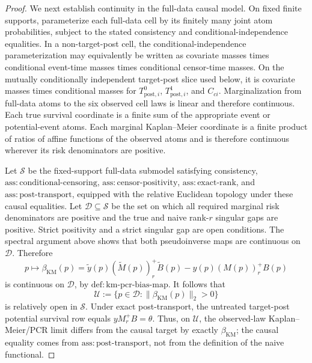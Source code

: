 \documentclass{article}
\begin{document}
\begin{proof}
We next establish continuity in the full-data causal model. On fixed finite supports, parameterize each full-data cell by its finitely many joint atom probabilities, subject to the stated consistency and conditional-independence equalities. In a non-target-post cell, the conditional-independence parameterization may equivalently be written as covariate masses times conditional event-time masses times conditional censor-time masses. On the mutually conditionally independent target-post slice used below, it is covariate masses times conditional masses for \(T^{0}_{\mathrm{post},i}\), \(T^{1}_{\mathrm{post},i}\), and \(C_{ci}\). Marginalization from full-data atoms to the six observed cell laws is linear and therefore continuous. Each true survival coordinate is a finite sum of the appropriate event or potential-event atoms. Each marginal Kaplan--Meier coordinate is a finite product of ratios of affine functions of the observed atoms and is therefore continuous wherever its risk denominators are positive.

Let \(\mathcal S\) be the fixed-support full-data submodel satisfying consistency, \(\mathrm{ass{:}conditional\mbox{-}censoring}\), \(\mathrm{ass{:}censor\mbox{-}positivity}\), \(\mathrm{ass{:}exact\mbox{-}rank}\), and \(\mathrm{ass{:}post\mbox{-}transport}\), equipped with the relative Euclidean topology under these causal equalities. Let \(\mathcal D\subseteq\mathcal S\) be the set on which all required marginal risk denominators are positive and the true and naive rank-\(r\) singular gaps are positive. Strict positivity and a strict singular gap are open conditions. The spectral argument above shows that both pseudoinverse maps are continuous on \(\mathcal D\). Therefore
\[
p\longmapsto\beta_{\mathrm{KM}}(p)
=\widetilde y(p)(\widetilde M(p))_r^+\widetilde B(p)
-y(p)(M(p))_r^+B(p)
\]
is continuous on \(\mathcal D\), by \(\mathrm{def{:}km\mbox{-}pcr\mbox{-}bias\mbox{-}map}\). It follows that
\[
\mathcal U:=\{p\in\mathcal D:\|\beta_{\mathrm{KM}}(p)\|_2>0\}
\]
is relatively open in \(\mathcal S\). Under exact post-transport, the untreated target-post potential survival row equals \(yM_r^+B=\theta\). Thus, on \(\mathcal U\), the observed-law Kaplan--Meier/PCR limit differs from the causal target by exactly \(\beta_{\mathrm{KM}}\); the causal equality comes from \(\mathrm{ass{:}post\mbox{-}transport}\), not from the definition of the naive functional.


\end{proof}
\end{document}
